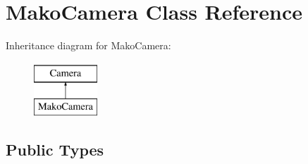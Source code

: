 \hypertarget{classMakoCamera}{\section{Mako\-Camera Class Reference}
\label{classMakoCamera}
}
Inheritance diagram for Mako\-Camera\-:\begin{figure}[H]
\begin{center}
\leavevmode
\includegraphics[height=2.000000cm]{classMakoCamera}
\end{center}
\end{figure}
\subsection*{Public Types}
